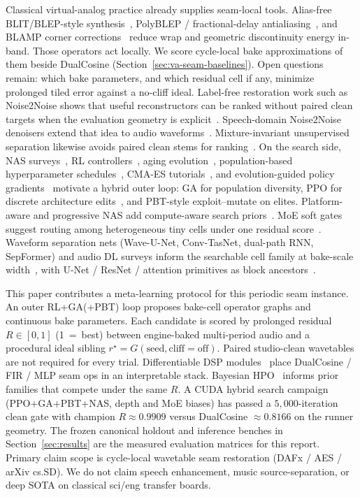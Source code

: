 Classical virtual-analog practice already supplies seam-local tools.
Alias-free BLIT/BLEP-style synthesis~\cite{stilson1996}, PolyBLEP / fractional-delay antialiasing~\cite{nam2009polyblep}, and BLAMP corner corrections~\cite{esqueda2016blamp} reduce wrap and geometric discontinuity energy in-band.
Those operators act locally.
We score cycle-local bake approximations of them beside DualCosine (Section~\ref{sec:va-seam-baselines}).
Open questions remain: which bake parameters, and which residual cell if any, minimize prolonged tiled error against a no-cliff ideal.
Label-free restoration work such as Noise2Noise shows that useful reconstructors can be ranked without paired clean targets when the evaluation geometry is explicit~\cite{lehtinen2018}.
Speech-domain Noise2Noise denoisers extend that idea to audio waveforms~\cite{kashyap2021n2n}.
Mixture-invariant unsupervised separation likewise avoids paired clean stems for ranking~\cite{wisdom2020}.
On the search side, NAS surveys~\cite{elsken2019}, RL controllers~\cite{zoph2017nas,pham2018}, aging evolution~\cite{real2017large,real2019}, population-based hyperparameter schedules~\cite{jaderberg2017}, CMA-ES tutorials~\cite{hansen2016cmaes}, and evolution-guided policy gradients~\cite{khadka2018} motivate a hybrid outer loop: GA for population diversity, PPO for discrete architecture edits~\cite{schulman2017}, and PBT-style exploit--mutate on elites.
Platform-aware and progressive NAS add compute-aware search priors~\cite{tan2019mnasnet,liu2018pnas}.
MoE soft gates suggest routing among heterogeneous tiny cells under one residual score~\cite{shazeer2017}.
Waveform separation nets (Wave-U-Net, Conv-TasNet, dual-path RNN, SepFormer) and audio DL surveys inform the searchable cell family at bake-scale width~\cite{stoller2018,macartney2018,luo2019,luo2020dprnn,subakan2021,purwins2019,gong2021ast}, with U-Net / ResNet / attention primitives as block ancestors~\cite{ronneberger2015,he2016resnet,vaswani2017,jansson2017}.

This paper contributes a meta-learning protocol for this periodic seam instance.
An outer RL+GA(+PBT) loop proposes bake-cell operator graphs and continuous bake parameters.
Each candidate is scored by prolonged residual $R\in[0,1]$ (1~=~best) between engine-baked multi-period audio and a procedural ideal sibling $r^{\star}=G(\mathrm{seed},\mathrm{cliff{=}off})$.
Paired studio-clean wavetables are not required for every trial.
Differentiable DSP modules~\cite{engel2020} place DualCosine / FIR / MLP seam ops in an interpretable stack.
Bayesian HPO~\cite{snoek2012} informs prior families that compete under the same $R$.
A CUDA hybrid search campaign (PPO+GA+PBT+NAS, depth and MoE biases) has passed a $5{,}000$-iteration clean gate with champion $R\approx 0.9909$ versus DualCosine $\approx 0.8166$ on the runner geometry.
The frozen canonical holdout and inference benches in Section~\ref{sec:results} are the measured evaluation matrices for this report.
Primary claim scope is cycle-local wavetable seam restoration (DAFx / AES / arXiv cs.SD).
We do not claim speech enhancement, music source-separation, or deep SOTA on classical sci/eng transfer boards.

